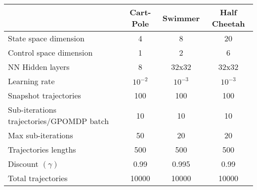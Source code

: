 \documentclass{article}
\theoremstyle{remark}
\theoremstyle{definition}
\begin{document}
\centering
\begin{tabular}{| l | c  c  c |}
	\hline	
	& Cart-Pole & Swimmer & Half Cheetah \\
	\hline
	State space dimension  & 4 & 8 & 20 \\
	Control space dimension & 1 & 2 & 6 \\
	NN Hidden layers & 8 & 32x32 & 32x32 \\
	Learning rate & $10^{-2}$ & $10^{-3}$ & $10^{-3}$ \\
	Snapshot trajectories & 100 & 100 & 100 \\
	Sub-iterations trajectories/GPOMDP batch & 10 & 10 & 10 \\
	Max sub-iterations & 50 & 20 & 20 \\
	Trajectories lengths& 500 & 500 & 500 \\
	Discount $(\gamma)$& 0.99 & 0.995 & 0.99 \\
	Total trajectories& 10000 & 10000 & 10000 \\
	\hline  
\end{tabular}
\end{document}
